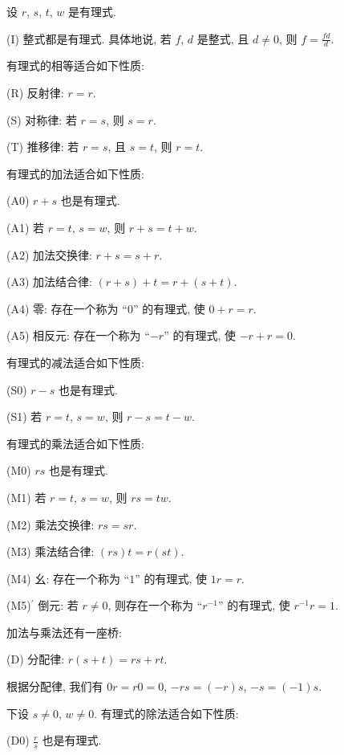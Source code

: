 \begin{proposition}
    设 $r$, $s$, $t$, $w$ 是有理式.

    (I) 整式都是有理式. 具体地说, 若 $f$, $d$ 是整式, 且 $d \neq 0$, 则 $f = \frac{fd}{d}$.

    有理式的相等适合如下性质:

    (R) 反射律: $r = r$.

    (S) 对称律: 若 $r = s$, 则 $s = r$.

    (T) 推移律: 若 $r = s$, 且 $s = t$, 则 $r = t$.

    有理式的加法适合如下性质:

    (A0) $r + s$ 也是有理式.

    (A1) 若 $r = t$, $s = w$, 则 $r + s = t + w$.

    (A2) 加法交换律: $r + s = s + r$.

    (A3) 加法结合律: $(r + s) + t = r + (s + t)$.

    (A4) 零: 存在一个称为 ``$0$'' 的有理式, 使 $0 + r = r$.

    (A5) 相反元: 存在一个称为 ``$-r$'' 的有理式, 使 $-r + r = 0$.

    有理式的减法适合如下性质:

    (S0) $r - s$ 也是有理式.

    (S1) 若 $r = t$, $s = w$, 则 $r - s = t - w$.

    有理式的乘法适合如下性质:

    (M0) $rs$ 也是有理式.

    (M1) 若 $r = t$, $s = w$, 则 $rs = tw$.

    (M2) 乘法交换律: $rs = sr$.

    (M3) 乘法结合律: $(rs)t = r(st)$.

    (M4) 幺: 存在一个称为 ``$1$'' 的有理式, 使 $1r = r$.

    (M5)$^{\prime}$ 倒元: 若 $r \neq 0$, 则存在一个称为 ``$r^{-1}$'' 的有理式, 使 $r^{-1} r = 1$.

    加法与乘法还有一座桥:

    (D) 分配律: $r (s + t) = rs + rt$.

    根据分配律, 我们有 $0r = r0 = 0$, $-rs = (-r)s$, $-s = (-1)s$.

    下设 $s \neq 0$, $w \neq 0$. 有理式的除法适合如下性质:

    (D0) $\frac{r}{s}$ 也是有理式.


\end{proposition}
